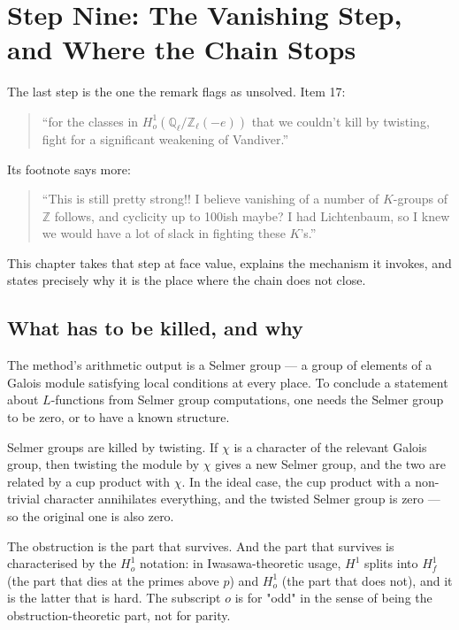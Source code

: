 
\chapter{Step Nine: The Vanishing Step, and Where the Chain Stops}
\label{ch:vanishing}

The last step is the one the remark flags as unsolved. Item 17:

\begin{quote}
\small
``for the classes in $H^1_o(\mathbb{Q}_\ell/\mathbb{Z}_\ell(-e))$ that we
couldn't kill by twisting, fight for a significant weakening of Vandiver.''
\end{quote}

Its footnote says more:

\begin{quote}
\small
``This is still pretty strong!! I believe vanishing of a number of $K$-groups
of $\mathbb{Z}$ follows, and cyclicity up to 100ish maybe? I had Lichtenbaum,
so I knew we would have a lot of slack in fighting these $K$'s.''
\end{quote}

This chapter takes that step at face value, explains the mechanism it invokes,
and states precisely why it is the place where the chain does not close.

\section{What has to be killed, and why}The method's arithmetic output is a Selmer group --- a group of elements of a
Galois module satisfying local conditions at every place. To conclude a
statement about $L$-functions from Selmer group computations, one needs the
Selmer group to be zero, or to have a known structure.

Selmer groups are killed by twisting. If $\chi$ is a character of the relevant
Galois group, then twisting the module by $\chi$ gives a new Selmer group, and
the two are related by a cup product with $\chi$. In the ideal case, the cup
product with a non-trivial character annihilates everything, and the twisted
Selmer group is zero --- so the original one is also zero.

The obstruction is the part that survives. And the part that survives is
characterised by the $H^1_o$ notation: in Iwasawa-theoretic usage, $H^1$ splits
into $H^1_f$ (the part that dies at the primes above $p$) and $H^1_o$ (the
part that does not), and it is the latter that is hard. The subscript $o$ is
for "odd" in the sense of being the obstruction-theoretic part, not for parity.


